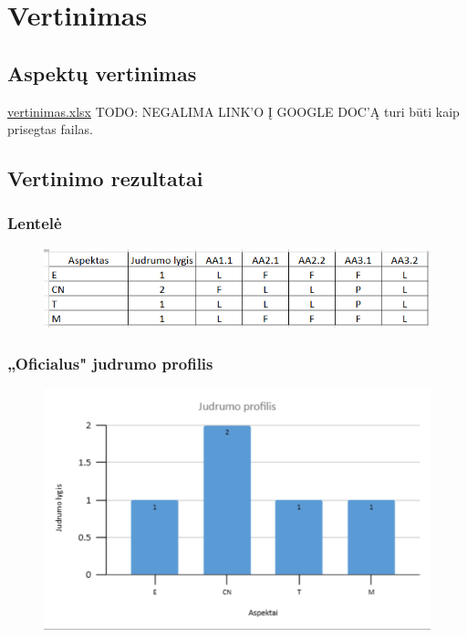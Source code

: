 \documentclass{article}
\begin{document}
\section{Vertinimas}

\subsection{Aspektų vertinimas}

\href{https://docs.google.com/spreadsheets/d/1unX_xcZLEGHqQOMCuBBXYvVhYjChxpnq/edit?usp=share_link&ouid=113452949406463366361&rtpof=true&sd=true}{vertinimas.xlsx} TODO: NEGALIMA LINK'O Į GOOGLE DOC'Ą turi būti kaip prisegtas failas.

\subsection{Vertinimo rezultatai}

\subsubsection{Lentelė}

\begin{figure}[H]%
    \centering
    \includegraphics[width=0.85\linewidth]{task-2/images/lentele.png}
\end{figure}

\subsubsection{„Oficialus" judrumo profilis}

\begin{figure}[H]%
    \centering
    \includegraphics[width=0.85\linewidth]{task-2/images/judrumo-profilis.png}
\end{figure}
\end{document}
